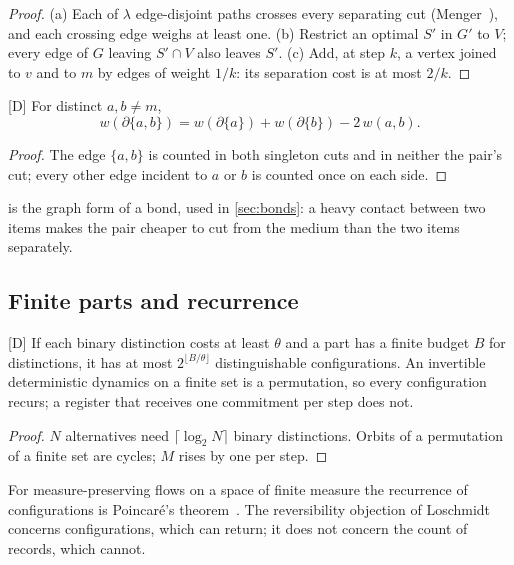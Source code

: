 \documentclass[10pt,twocolumn,a4paper]{article}
\newcommand{\med}{m}
\newcommand{\cut}{\partial}
\newcommand{\D}{\textsf{[D]}}
\begin{document}
\begin{proof}
(a) Each of $\lambda$ edge-disjoint paths crosses every separating cut
(Menger~\citep{menger1927}), and each crossing edge weighs at least one. (b)
Restrict an optimal $S'$ in $G'$ to $V$; every edge of $G$ leaving $S'\cap V$
also leaves $S'$. (c) Add, at step $k$, a vertex joined to $v$ and to $\med$
by edges of weight $1/k$: its separation cost is at most $2/k$.
\end{proof}

\begin{proposition}
\label{prop:pair}
\D{} For distinct $a,b\ne\med$,
\begin{equation}
w(\cut\{a,b\})=w(\cut\{a\})+w(\cut\{b\})-2\,w(a,b).
\label{eq:pair}
\end{equation}
\end{proposition}

\begin{proof}
The edge $\{a,b\}$ is counted in both singleton cuts and in neither the pair's
cut; every other edge incident to $a$ or $b$ is counted once on each side.
\end{proof}

 is the graph form of a bond, used in \cref{sec:bonds}: a heavy
contact between two items makes the pair cheaper to cut from the medium than
the two items separately.

\subsection{Finite parts and recurrence}

\begin{proposition}
\label{prop:finite}
\D{} If each binary distinction costs at least $\theta$ and a part has a
finite budget $B$ for distinctions, it has at most $2^{\lfloor B/\theta\rfloor}$
distinguishable configurations. An invertible deterministic dynamics on a
finite set is a permutation, so every configuration recurs; a register that
receives one commitment per step does not.
\end{proposition}

\begin{proof}
$N$ alternatives need $\lceil\log_2N\rceil$ binary distinctions. Orbits of a
permutation of a finite set are cycles; $M$ rises by one per step.
\end{proof}

For measure-preserving flows on a space of finite measure the recurrence of
configurations is Poincaré's theorem~\citep{poincare1890}. The reversibility
objection of Loschmidt~\citep{loschmidt1876} concerns configurations, which
can return; it does not concern the count of records, which cannot.
\end{document}
